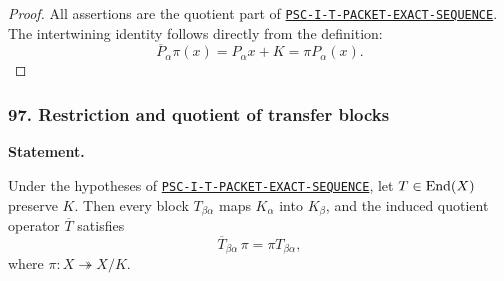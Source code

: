 \begin{proof}
All assertions are the quotient part of \hyperref[rec:PSC-I-T-PACKET-EXACT-SEQUENCE]{\nolinkurl{PSC-I-T-PACKET-EXACT-SEQUENCE}}.  The intertwining identity follows directly from the definition:
\[
\overline P_\alpha\pi(x)=P_\alpha x+K=\pi P_\alpha(x).
\]
\end{proof}
\subsubsection*{97. Restriction and quotient of transfer blocks}
\label{rec:PSC-I-C-QUOTIENT-PACKET-DESCENT}
\textbf{Statement.}\par
Under the hypotheses of \hyperref[rec:PSC-I-T-PACKET-EXACT-SEQUENCE]{\nolinkurl{PSC-I-T-PACKET-EXACT-SEQUENCE}}, let $T\in\operatorname{End}(X)$ preserve $K$.  Then every block $T_{\beta\alpha}$ maps $K_\alpha$ into $K_\beta$, and the induced quotient operator $\overline T$ satisfies
\[
\boxed{
\overline T_{\beta\alpha}\,\pi
=
\pi T_{\beta\alpha},
}
\]
where $\pi:X\twoheadrightarrow X/K$.

